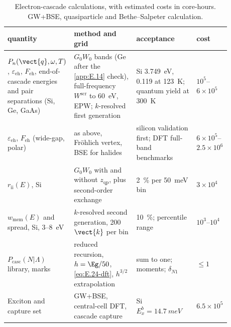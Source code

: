 \begin{table}[t]
  \caption{Electron-cascade calculations, with estimated costs in core-hours. GW+BSE, quasiparticle and Bethe--Salpeter calculation.}
  \label{tab:E24-summary}
  \centering
  \small
  \begin{tabular}{p{0.19\linewidth}p{0.29\linewidth}p{0.27\linewidth}p{0.13\linewidth}}
    \toprule
    quantity & method and grid & acceptance & cost \\
    \midrule
    $P_n(\vect{q}, \omega, T)$, $\varepsilon_{\mathrm{eh}}$, $F_{\mathrm{eh}}$, end-of-cascade energies and pair separations (Si, Ge, GaAs) & $G_0W_0$ bands (Ge after the \cref{app:E.14} check), full-frequency $W^{\mathrm{scr}}$ to \SI{60}{eV}, EPW; $k$-resolved first generation & Si \SI{3.749}{eV}, 0.119 at \SI{123}{K}; quantum yield at \SI{300}{K} & $10^5$--$6\times10^5$ \\
    $\varepsilon_{\mathrm{eh}}$, $F_{\mathrm{eh}}$ (wide-gap, polar) & as above, Fr\"ohlich vertex, BSE for halides & silicon validation first; DFT full-band benchmarks & $6\times10^5$--$2.5\times10^6$ \\
    $r_{\mathrm{ii}}(E)$, Si & $G_0W_0$ with and without $z_{\mathrm{qp}}$, plus second-order exchange & \SI{2}{\percent} per \SI{50}{meV} bin & $3\times10^4$ \\
    $w_{\mathrm{mem}}(E)$ and spread, Si, 3--\SI{8}{eV} & $k$-resolved second generation, 200 $\vect{k}$ per bin & \SI{10}{\percent}; percentile range & $10^3$--$10^4$ \\
    $P_{\mathrm{casc}}(N|\Lambda)$ library, marks & reduced recursion, $h = \Eg/50$, \cref{eq:E.24-dft}, $h^{3/2}$ extrapolation & sum to one; moments; $\delta_{N1}$ & $\le 1$ \\
    Exciton and capture set & GW+BSE, central-cell DFT, cascade capture & Si $E_x^b = \SI{14.7}{meV}$ & $6.5\times10^5$ \\
    \bottomrule
  \end{tabular}
\end{table}
